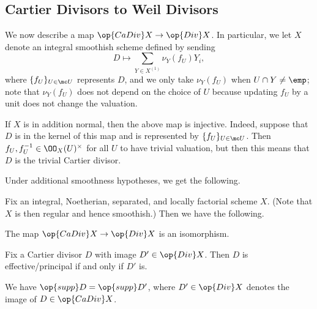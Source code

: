 \documentclass[../notes.tex]{subfiles}
\begin{document}
\subsection{Cartier Divisors to Weil Divisors}
We now describe a map $\op{CaDiv}X\to\op{Div}X$. In particular, we let $X$ denote an integral smoothish scheme defined by sending
\[D\mapsto\sum_{Y\in X^{(1)}}\nu_Y(f_U)Y_i,\]
where $\{f_U\}_{U\in\mc U}$ represents $D$, and we only take $\nu_Y(f_U)$ when $U\cap Y\ne\emp$; note that $\nu_Y(f_U)$ does not depend on the choice of $U$ because updating $f_U$ by a unit does not change the valuation.
\begin{remark} \label{rem:normal-means-compare-div-inj}
	If $X$ is in addition normal, then the above map is injective. Indeed, suppose that $D$ is in the kernel of this map and is represented by $\{f_U\}_{U\in\mc U}$. Then $f_U,f_U^{-1}\in\OO_X(U)^\times$ for all $U$ to have trivial valuation, but then this means that $D$ is the trivial Cartier divisor.
\end{remark}
Under additional smoothness hypotheses, we get the following.
\begin{proposition} \label{prop:compare-cartier-weil}
	Fix an integral, Noetherian, separated, and locally factorial scheme $X$. (Note that $X$ is then regular and hence smoothish.) Then we have the following.
	\begin{listalph}
		\item The map $\op{CaDiv}X\to\op{Div}X$ is an isomorphism.
		\item Fix a Cartier divisor $D$ with image $D'\in\op{Div}X$. Then $D$ is effective/principal if and only if $D'$ is.
		\item We have $\op{supp}D=\op{supp}D'$, where $D'\in\op{Div}X$ denotes the image of $D\in\op{CaDiv}X$.
	\end{listalph}
\end{proposition}
\end{document}
